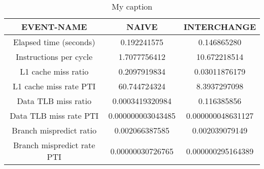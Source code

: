\begin{table}[]
\centering
\caption{My caption}
\label{my-label}
\begin{tabular}{|c|c|c|}
\hline
\textbf{EVENT-NAME}        & \textbf{NAIVE}    & \textbf{INTERCHANGE} \\ \hline
Elapsed time (seconds)     & 0.192241575       & 0.146865280          \\ \hline
Instructions per cycle     & 1.7077756412      & 10.672218514         \\ \hline
L1 cache miss ratio        & 0.2097919834      & 0.03011876179        \\ \hline
L1 cache miss rate PTI     & 60.744724324      & 8.3937297098         \\ \hline
Data TLB miss ratio        & 0.0003419320984   & 0.116385856          \\ \hline
Data TLB miss rate PTI     & 0.000000003043485 & 0.000000048631127    \\ \hline
Branch mispredict ratio    & 0.002066387585    & 0.002039079149       \\ \hline
Branch mispredict rate PTI & 0.00000030726765  & 0.000000295164389    \\ \hline
\end{tabular}
\end{table}